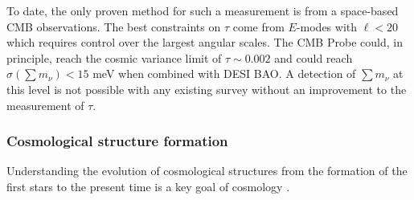 To date, the only proven method for such a measurement is from a space-based CMB observations.  The best constraints on $\tau$ come from $E$-modes with $\ell < 20$ which requires control over the largest angular scales.  The \ac{CMB} Probe could, in principle, reach the cosmic variance limit of $\tau \sim 0.002$ and could reach $\sigma(\sum m_\nu) < 15$ meV when combined with DESI BAO.  A detection of $\sum m_\nu$ at this level is not possible with any existing survey without an improvement to the measurement of $\tau$.


\vspace{-0.15in}

\subsubsection{Cosmological structure formation}

\vspace{-0.05in}

Understanding the evolution of cosmological structures from the formation of the
first stars to the present time is a key goal of cosmology \citep{dunlop2011}. 


